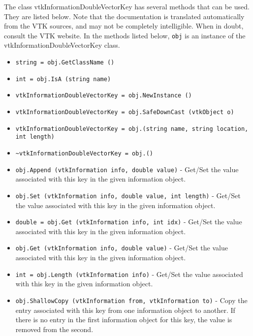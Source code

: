 The class vtkInformationDoubleVectorKey has several methods that can be used.
  They are listed below.
Note that the documentation is translated automatically from the VTK sources,
and may not be completely intelligible.  When in doubt, consult the VTK website.
In the methods listed below, \verb|obj| is an instance of the vtkInformationDoubleVectorKey class.
\begin{itemize}
\item  \verb|string = obj.GetClassName ()|

\item  \verb|int = obj.IsA (string name)|

\item  \verb|vtkInformationDoubleVectorKey = obj.NewInstance ()|

\item  \verb|vtkInformationDoubleVectorKey = obj.SafeDownCast (vtkObject o)|

\item  \verb|vtkInformationDoubleVectorKey = obj.(string name, string location, int length)|

\item  \verb|~vtkInformationDoubleVectorKey = obj.()|

\item  \verb|obj.Append (vtkInformation info, double value)| -  Get/Set the value associated with this key in the given
 information object.

\item  \verb|obj.Set (vtkInformation info, double value, int length)| -  Get/Set the value associated with this key in the given
 information object.

\item  \verb|double = obj.Get (vtkInformation info, int idx)| -  Get/Set the value associated with this key in the given
 information object.

\item  \verb|obj.Get (vtkInformation info, double value)| -  Get/Set the value associated with this key in the given
 information object.

\item  \verb|int = obj.Length (vtkInformation info)| -  Get/Set the value associated with this key in the given
 information object.

\item  \verb|obj.ShallowCopy (vtkInformation from, vtkInformation to)| -  Copy the entry associated with this key from one information
 object to another.  If there is no entry in the first information
 object for this key, the value is removed from the second.

\end{itemize}
